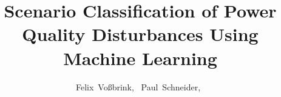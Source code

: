 \title{Scenario Classification of Power Quality Disturbances Using Machine Learning}

\author{Felix~Voßbrink,~
        Paul~Schneider,~
}
